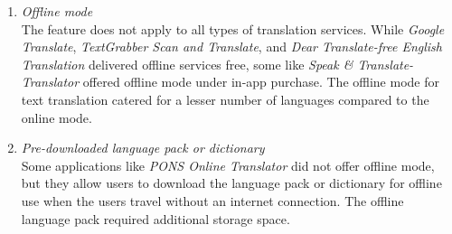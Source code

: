 \documentclass[english]{textolivre}
\begin{document}
\begin{enumerate}[label=\alph*.]
    \item \textit{Offline mode} \\
    The feature does not apply to all types of translation services. While \textit{Google Translate}, \textit{TextGrabber Scan and Translate}, and \textit{Dear Translate-free English Translation} delivered offline services free, some like \textit{Speak \& Translate-Translator} offered offline mode under in-app purchase. The offline mode for text translation catered for a lesser number of languages compared to the online mode.
    \item \textit{Pre-downloaded language pack or dictionary} \\
    Some applications like \textit{PONS Online Translator} did not offer offline mode, but they allow users to download the language pack or dictionary for offline use when the users travel without an internet connection. The offline language pack required additional storage space.
\end{enumerate}
\end{document}
